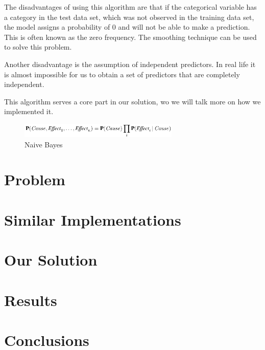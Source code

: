 \documentclass[sigconf,12pt,review=false,natbib=false]{acmart}
\begin{document}
The disadvantages of using this algorithm are that if the categorical variable has a category in the test data set,
which was not observed in the training data set, the model assigns a probability of 0 and will not be able to make
a prediction. This is often known as the zero frequency. The smoothing technique can be used to solve this problem.

Another disadvantage is the assumption of independent predictors. In real life it is almost impossible for us to
obtain a set of predictors that are completely independent.

This algorithm serves a core part in our solution, wo we will talk more on how we implemented it.

\begin{figure}[h!]
    \centering
    \includegraphics[width=3in]{naive_bayes}
    \caption{Naive Bayes}
    \label{fig:naive_bayes}
\end{figure}

\section{Problem}

\section{Similar Implementations}

\section{Our Solution}

\section{Results}

\section{Conclusions}

\nocite{*}
\printbibliography
\end{document}
